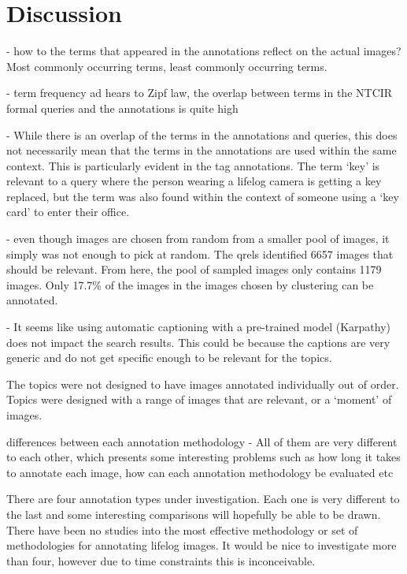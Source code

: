 \chapter{Discussion}

- how to the terms that appeared in the annotations reflect on the actual images? Most commonly occurring terms, least commonly occurring terms.

- term frequency ad hears to Zipf law, the overlap between terms in the NTCIR formal queries and the annotations is quite high

- While there is an overlap of the terms in the annotations and queries, this does not necessarily mean that the terms in the annotations are used within the same context. This is particularly evident in the tag annotations. The term `key' is relevant to a query where the person wearing a lifelog camera is getting a key replaced, but the term was also found within the context of someone using a `key card' to enter their office.

- even though images are chosen from random from a smaller pool of images, it simply was not enough to pick at random. The qrels identified 6657 images that should be relevant. From here, the pool of sampled images only contains 1179 images. Only 17.7\% of the images in the images chosen by clustering can be annotated.

- It seems like using automatic captioning with a pre-trained model (Karpathy) does not impact the search results. This could be because the captions are very generic and do not get specific enough to be relevant for the topics. 


The topics were not designed to have images annotated individually out of order. Topics were designed with a range of images that are relevant, or a `moment' of images. 

differences between each annotation methodology - All of them are very different to each other, which presents some interesting problems such as how long it takes to annotate each image, how can each annotation methodology be evaluated etc

There are four annotation types under investigation. Each one is very different to the last and some interesting comparisons will hopefully be able to be drawn. There have been no studies into the most effective methodology or set of methodologies for annotating lifelog images. It would be nice to investigate more than four, however due to time constraints this is inconceivable.